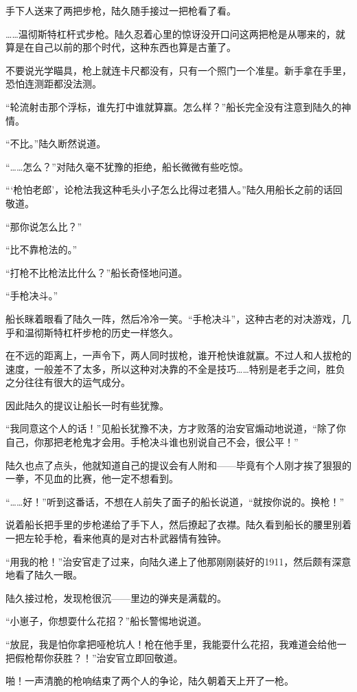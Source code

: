 手下人送来了两把步枪，陆久随手接过一把枪看了看。

……温彻斯特杠杆式步枪。陆久忍着心里的惊讶没开口问这两把枪是从哪来的，就算是在自己以前的那个时代，这种东西也算是古董了。

不要说光学瞄具，枪上就连卡尺都没有，只有一个照门一个准星。新手拿在手里，恐怕连测距都没法测。

“轮流射击那个浮标，谁先打中谁就算赢。怎么样？”船长完全没有注意到陆久的神情。

“不比。”陆久断然说道。

“……怎么？”对陆久毫不犹豫的拒绝，船长微微有些吃惊。

“‘枪怕老郎’，论枪法我这种毛头小子怎么比得过老猎人。”陆久用船长之前的话回敬道。

“那你说怎么比？”

“比不靠枪法的。”

“打枪不比枪法比什么？”船长奇怪地问道。

“手枪决斗。”

船长眯着眼看了陆久一阵，然后冷冷一笑。“手枪决斗”，这种古老的对决游戏，几乎和温彻斯特杠杆步枪的历史一样悠久。

在不远的距离上，一声令下，两人同时拔枪，谁开枪快谁就赢。不过人和人拔枪的速度，一般差不了太多，所以这种对决靠的不全是技巧……特别是老手之间，胜负之分往往有很大的运气成分。

因此陆久的提议让船长一时有些犹豫。

“我同意这个人的话！”见船长犹豫不决，方才败落的治安官煽动地说道，“除了你自己，你那把老枪鬼才会用。手枪决斗谁也别说自己不会，很公平！”

陆久也点了点头，他就知道自己的提议会有人附和——毕竟有个人刚才挨了狠狠的一拳，不见血的比赛，他一定不想看到。

“……好！”听到这番话，不想在人前失了面子的船长说道，“就按你说的。换枪！”

说着船长把手里的步枪递给了手下人，然后撩起了衣襟。陆久看到船长的腰里别着一把左轮手枪，看来他真的是对古朴武器情有独钟。

“用我的枪！”治安官走了过来，向陆久递上了他那刚刚装好的1911，然后颇有深意地看了陆久一眼。

陆久接过枪，发现枪很沉——里边的弹夹是满载的。

“小崽子，你想耍什么花招？”船长警惕地说道。

“放屁，我是怕你拿把哑枪坑人！枪在他手里，我能耍什么花招，我难道会给他一把假枪帮你获胜？！”治安官立即回敬道。

啪！一声清脆的枪响结束了两个人的争论，陆久朝着天上开了一枪。

